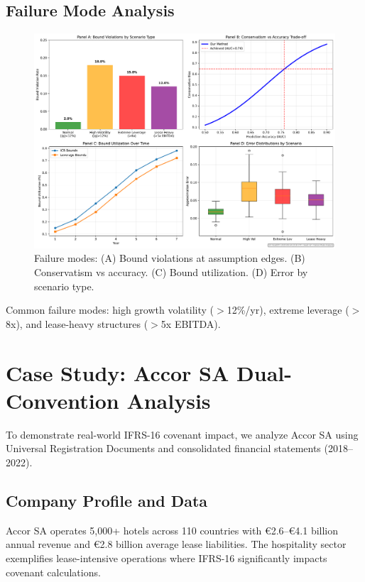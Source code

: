 \documentclass[11pt,a4paper]{article}
\theoremstyle{plain}
\theoremstyle{definition}
\begin{document}
\subsection{Failure Mode Analysis}

\begin{figure}[H]
\centering
\includegraphics[width=\textwidth]{F15_failure_modes}
\caption{Failure modes: (A) Bound violations at assumption edges. (B) Conservatism vs accuracy. (C) Bound utilization. (D) Error by scenario type.}
\label{fig:failure_modes}
\end{figure}

Common failure modes: high growth volatility ($>$12\%/yr), extreme leverage ($>$8x), and lease-heavy structures ($>$5x EBITDA).

\section{Case Study: Accor SA Dual-Convention Analysis}
\label{sec:accor}

To demonstrate real-world IFRS-16 covenant impact, we analyze Accor SA using Universal Registration Documents and consolidated financial statements (2018--2022).

\subsection{Company Profile and Data}

Accor SA operates 5{,}000+ hotels across 110 countries with \euro2.6--\euro4.1 billion annual revenue and \euro2.8 billion average lease liabilities. The hospitality sector exemplifies lease-intensive operations where IFRS-16 significantly impacts covenant calculations.
\end{document}
